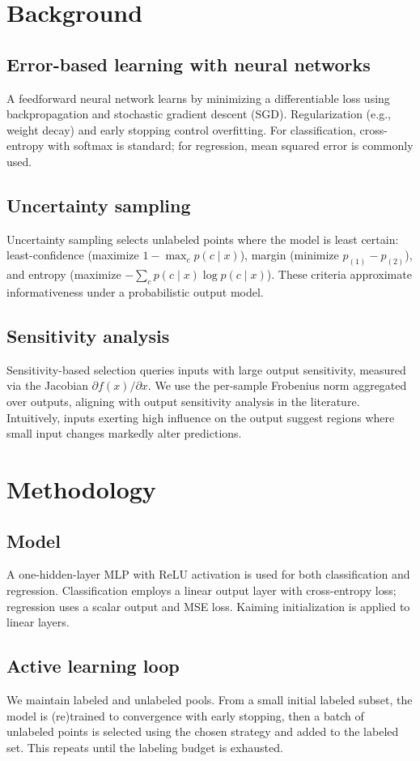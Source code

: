 \documentclass[conference]{IEEEtran}
\begin{document}
\section{Background}
\subsection{Error-based learning with neural networks}
A feedforward neural network learns by minimizing a differentiable loss using backpropagation and stochastic gradient descent (SGD). Regularization (e.g., weight decay) and early stopping control overfitting. For classification, cross-entropy with softmax is standard; for regression, mean squared error is commonly used.

\subsection{Uncertainty sampling}
Uncertainty sampling selects unlabeled points where the model is least certain: least-confidence (maximize $1-\max_c p(c\mid x)$), margin (minimize $p_{(1)}-p_{(2)}$), and entropy (maximize $-\sum_c p(c\mid x)\log p(c\mid x)$). These criteria approximate informativeness under a probabilistic output model.

\subsection{Sensitivity analysis}
Sensitivity-based selection queries inputs with large output sensitivity, measured via the Jacobian $\partial f(x)/\partial x$. We use the per-sample Frobenius norm aggregated over outputs, aligning with output sensitivity analysis in the literature. Intuitively, inputs exerting high influence on the output suggest regions where small input changes markedly alter predictions.

\section{Methodology}
\subsection{Model}
A one-hidden-layer MLP with ReLU activation is used for both classification and regression. Classification employs a linear output layer with cross-entropy loss; regression uses a scalar output and MSE loss. Kaiming initialization is applied to linear layers.

\subsection{Active learning loop}
We maintain labeled and unlabeled pools. From a small initial labeled subset, the model is (re)trained to convergence with early stopping, then a batch of unlabeled points is selected using the chosen strategy and added to the labeled set. This repeats until the labeling budget is exhausted.
\end{document}
